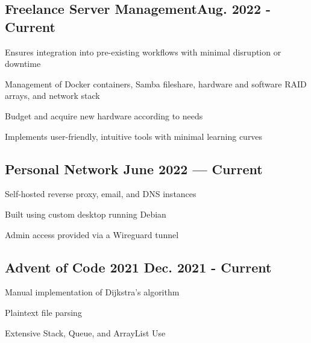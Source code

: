 \documentclass[letter,10pt]{article}
\begin{document}
\subsection{{Freelance Server Management\hfill Aug. 2022 - Current}}
\begin{zitemize}
	\item Ensures integration into pre-existing workflows with minimal disruption or downtime
    \item Management of Docker containers, Samba fileshare, hardware and software RAID arrays, and network stack
	\item Budget and acquire new hardware according to needs
    \item Implements user-friendly, intuitive tools with minimal learning curves
\end{zitemize}

\subsection{{Personal Network \hfill June 2022 --- Current}}
\begin{zitemize}
	\item Self-hosted reverse proxy, email, and DNS instances
	\item Built using custom desktop running Debian
	\item Admin access provided via a Wireguard tunnel
\end{zitemize}

\subsection{{Advent of Code 2021 \hfill Dec. 2021 - Current}}
\begin{zitemize}
	\item Manual implementation of Dijkstra's algorithm
	\item Plaintext file parsing
	\item Extensive Stack, Queue, and ArrayList Use
\end{zitemize}

\end{document}
